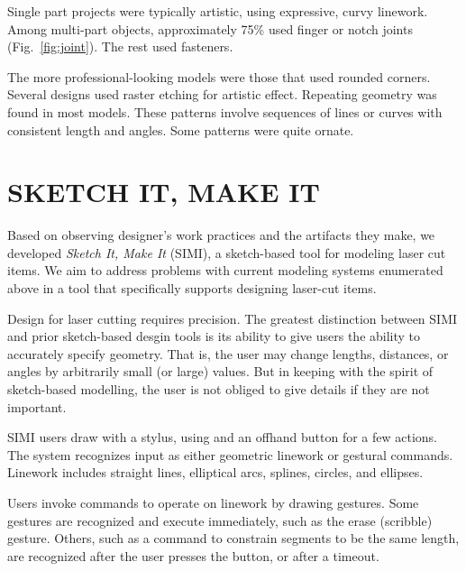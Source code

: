 \documentclass{article}
\begin{document}
Single part projects were typically artistic, using expressive, curvy
linework. Among multi-part objects, approximately 75\% used finger or
notch joints (Fig.~\ref{fig:joint}). The rest used fasteners.

The more professional-looking models were those that used rounded
corners. Several designs used raster etching for artistic
effect. Repeating geometry was found in most models. These patterns
involve sequences of lines or curves with consistent length and
angles. Some patterns were quite ornate.

\section{SKETCH IT, MAKE IT}

Based on observing designer's work practices and the artifacts they
make, we developed \textit{Sketch It, Make It} (SIMI), a sketch-based
tool for modeling laser cut items. We aim to address problems with
current modeling systems enumerated above in a tool that specifically
supports designing laser-cut items.

Design for laser cutting requires precision. The greatest distinction
between SIMI and prior sketch-based desgin tools is its ability to
give users the ability to accurately specify geometry. That is, the
user may change lengths, distances, or angles by arbitrarily small (or
large) values. But in keeping with the spirit of sketch-based
modelling, the user is not obliged to give details if they are not
important.


SIMI users draw with a stylus, using and an offhand button for a few
actions. The system recognizes input as either geometric linework or
gestural commands. Linework includes straight lines, elliptical arcs,
splines, circles, and ellipses.

Users invoke commands to operate on linework by drawing gestures. Some
gestures are recognized and execute immediately, such as the erase
(scribble) gesture. Others, such as a command to constrain segments to
be the same length, are recognized after the user presses the button,
or after a timeout.
\end{document}
